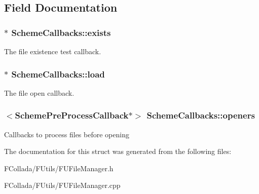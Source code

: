 \subsection{Field Documentation}
\hypertarget{structSchemeCallbacks_a911c7c4e197a9fbe00364e1f0bf20200}{
\subsubsection[{exists}]{$\ast$ {\bf SchemeCallbacks::exists}}}
\label{structSchemeCallbacks_a911c7c4e197a9fbe00364e1f0bf20200}
The file existence test callback. \hypertarget{structSchemeCallbacks_abb6b2030a834466fc6f3673916ad8f59}{
\subsubsection[{load}]{$\ast$ {\bf SchemeCallbacks::load}}}
\label{structSchemeCallbacks_abb6b2030a834466fc6f3673916ad8f59}
The file open callback. \hypertarget{structSchemeCallbacks_a8cb30bfc775cd2611484f995fdcff798}{
\subsubsection[{openers}]{$<${\bf SchemePreProcessCallback}$\ast$$>$ {\bf SchemeCallbacks::openers}}}
\label{structSchemeCallbacks_a8cb30bfc775cd2611484f995fdcff798}
Callbacks to process files before opening 

The documentation for this struct was generated from the following files:\begin{DoxyCompactItemize}
\item 
FCollada/FUtils/FUFileManager.h\item 
FCollada/FUtils/FUFileManager.cpp\end{DoxyCompactItemize}
